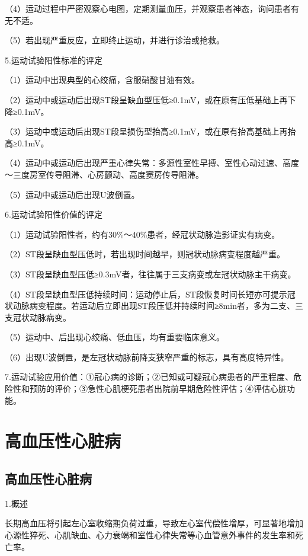 （4）运动过程中严密观察心电图，定期测量血压，并观察患者神态，询问患者有无不适。

（5）若出现严重反应，立即终止运动，并进行诊治或抢救。

5.运动试验阳性标准的评定

（1）运动中出现典型的心绞痛，含服硝酸甘油有效。

（2）运动中或运动后出现ST段呈缺血型压低≥0.1mV，或在原有压低基础上再下降≥0.1mV。

（3）运动中或运动后出现ST段呈损伤型抬高≥0.1mV，或在原有抬高基础上再抬高≥0.1mV。

（4）运动中或运动后出现严重心律失常：多源性室性早搏、室性心动过速、高度～三度房室传导阻滞、心房颤动、高度窦房传导阻滞。

（5）运动中或运动后出现U波倒置。

6.运动试验阳性价值的评定

（1）运动试验阳性者，约有30\%～40\%患者，经冠状动脉造影证实有病变。

（2）ST段呈缺血型压低时，若出现时间越早，则冠状动脉病变程度越严重。

（3）ST段呈缺血型压低≥0.3mV者，往往属于三支病变或左冠状动脉主干病变。

（4）ST段呈缺血型压低持续时间：运动停止后，ST段恢复时间长短亦可提示冠状动脉病变程度。若运动后立即出现ST段压低并持续时间≥8min者，多为二支、三支冠状动脉病变。

（5）运动中、后出现心绞痛、低血压，均有重要临床意义。

（6）出现U波倒置，是左冠状动脉前降支狭窄严重的标志，具有高度特异性。

7.运动试验应用价值：①冠心病的诊断；②已知或可疑冠心病患者的严重程度、危险性和预防的评价；③急性心肌梗死患者出院前早期危险性评估；④评估心脏功能。

\protect\hypertarget{text00050.htmlux5cux23subid593}{}{}

\section{高血压性心脏病}

\protect\hypertarget{text00050.htmlux5cux23subid594}{}{}

\subsection{高血压性心脏病}

1.概述

长期高血压将引起左心室收缩期负荷过重，导致左心室代偿性增厚，可显著地增加心源性猝死、心肌缺血、心力衰竭和室性心律失常等心血管意外事件的发生率和死亡率。

